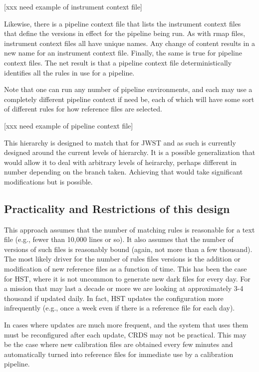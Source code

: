 \documentclass[final,authoryear,5p,times,twocolumn]{elsarticle}
\begin{document}
[xxx need example of instrument context file]

Likewise, there is a pipeline context file that lists the instrument context
files that define the versions in effect for the pipeline being run. As with
rmap files, instrument context files all have unique names. Any change of
content results in a new name for an instrument context file. Finally, the same
is true for pipeline context files. The net result is that a pipeline context
file deterministically identifies all the rules in use for a pipeline. 

Note that one can run any number of pipeline environments, and each may use a
completely different pipeline context if need be, each of which will have some
sort of different rules for how reference files are selected.

[xxx need example of pipeline context file]

This hierarchy is designed to match that for JWST and as such is currently
designed around the current levels of hierarchy. It is a possible generalization
that would allow it to deal with arbitrary levels of heirarchy, perhaps
different in number depending on the branch taken. Achieving that would
take significant modifications but is possible. 

\subsection{Practicality and Restrictions of this design}

This approach assumes that the number of matching rules is reasonable for a
text file (e.g., fewer than 10,000 lines or so). It also assumes that the
number of versions of such files is reasonably bound (again, not more than a
few thousand). The most likely driver for the number of rules files versions is
the addition or modification of new reference files as a function of time. This has
been the case for HST, where it is not uncommon to generate new dark files for
every day. For a mission that may last a decade or more we are looking at
approximately 3-4 thousand if updated daily. In fact, HST updates the
configuration more infrequently (e.g., once a week even if there is a reference
file for each day).

In cases where updates are much more frequent, and the system that uses
them must be reconfigured after each update, CRDS may not be practical. This
may be the case where new calibration files are obtained every few minutes and
automatically turned into reference files for immediate use by a calibration
pipeline.
\end{document}
